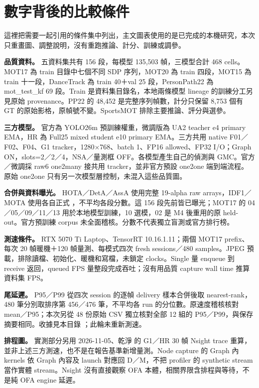 \documentclass[UTF8,11pt,a4paper,fontset=none]{ctexart}
\newcommand{\code}[1]{\texttt{\detokenize{#1}}}
\begin{document}
\appendix
\clearpage
\section{數字背後的比較條件}
這裡把需要一起引用的條件集中列出，主文圖表使用的是已完成的本機研究，本次只重畫圖、調整說明，沒有重跑推論、計分、訓練或調參。

\textbf{品質資料。} 五資料集共有 156 段，每模型 135,503 幀，三模型合計 468 cells。MOT17 為 train 目錄中七個不同 SDP 序列，MOT20 為 train 四段，MOT15 為 train 十一段，DanceTrack 為 train 40＋val 25 段，PersonPath22 為 mot\_test\_kf 69 段。Train 是資料集目錄名，本地兩條模型 lineage 的訓練分工另見原始 provenance。PP22 的 48,452 是完整序列幀數，計分只保留 8,753 個有 GT 的原始影格，原幀號不變。SportsMOT 排除主要推論、評分與選參。\cite{primary156}

\textbf{三方模型。} 官方為 YOLO26m 預訓練權重，微調版為 UA2 teacher e4 primary EMA，HR 為 Full25 mixed student e10 primary EMA。三方共用 native F01／F02、F04、G1 tracker，1280×768、batch 1、FP16 allowed、FP32 I/O；Graph ON，slots=2／2／4，NSA／量測框 OFF。各模型產生自己的偵測與 GMC。官方／微調採 raw6 one2many 接共用 tracker，並非官方預設 one2one 端到端流程。原始 one2one 只有另一次模型層控制，未混入這些品質圖。\cite{trtcompare}

\textbf{合併與資料曝光。} HOTA／DetA／AssA 使用完整 19-alpha raw arrays，IDF1／MOTA 使用各自正式 \code{combine_sequences}，不平均各段分數。這 156 段先前皆已曝光；MOT17 的 04／05／09／11／13 用於本地模型訓練，10 選模，02 是 M4 後重用的原 held-out。官方預訓練 corpus 未全面稽核。分數不代表獨立盲測或官方排行榜。\cite{primary156}

\textbf{測速條件。} RTX 5070 Ti Laptop、TensorRT 10.16.1.11；兩個 MOT17 prefix、每次 20 幀暖機＋120 幀量測、每模式四次 fresh sessions／480 samples。JPEG 預載，排除讀檔、初始化、暖機和寫檔，未鎖定 clocks。Single 量 enqueue 到 receive 返回，queued FPS 量整段完成吞吐；沒有用品質 capture wall time 推算資料集 FPS。\cite{trtcompare}

\textbf{尾延遲。} P95／P99 從四次 session 的逐幀 delivery 樣本合併後取 nearest-rank，480 筆分別取排序第 456／476 筆，不平均各 run 的分位數。原速度稽核核對 mean／P95；本次另從 48 份原始 CSV 獨立核對全部 12 組的 P95／P99，與保存摘要相同。收據見本目錄 ；此輪未重新測速。

\textbf{排程圖。} 實測部分另用 2026-11-05、乾淨 \code{fae5cb7} 的 G1／HR 30 幀 Nsight trace 重算，並非上述三方測速，也不是在報告基準新增量測。Node capture 的 Graph 內 kernels 依 Graph 內容及 launch 對應回 D／M，不把 profiler 的 synthetic stream 當作實體 stream。Nsight 沒有直接觀察 OFA 本體，相關界限含排程與等待，不是純 OFA engine 延遲。\cite{nsys}
\end{document}
